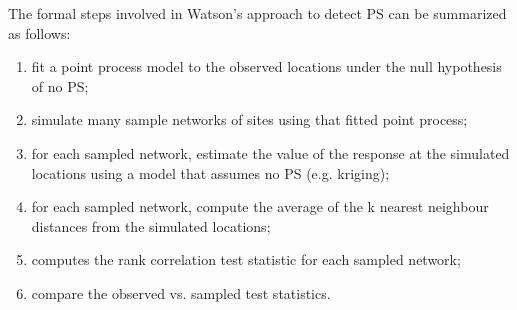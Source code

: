 \documentclass{article}
\begin{document}


The formal steps involved in  Watson's approach \cite{watson2020} to detect \ac{PS} can be summarized as follows:
\begin{enumerate}
	\item fit a point process model to the observed locations under the null hypothesis of no \ac{PS};
	\item simulate many sample networks of sites using that fitted point process;
	\item for each sampled network, estimate the value of the response at the simulated locations using a model that assumes no PS (e.g. kriging); 
	\item for each sampled network, compute the average of the \gls{k} nearest neighbour distances from the simulated locations; 
	\item computes the rank correlation test statistic for each sampled network;
	\item compare the observed vs. sampled test statistics.
\end{enumerate}




\end{document}
